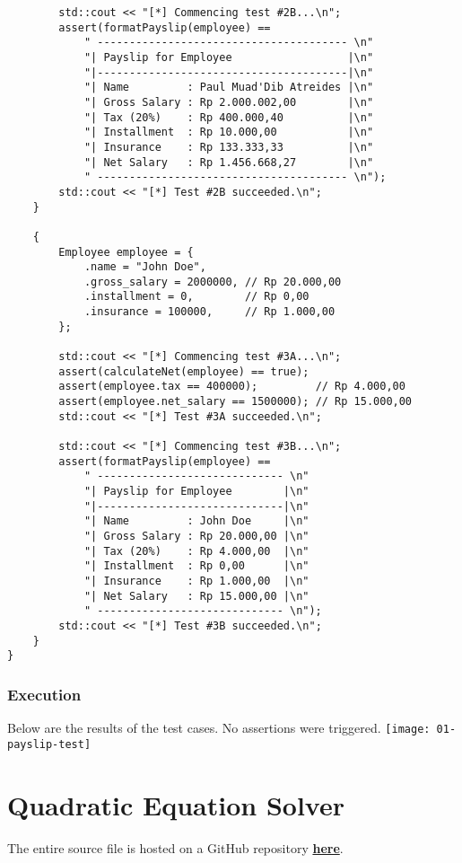 \documentclass[12pt]{article}
\begin{document}
\begin{verbatim}
        std::cout << "[*] Commencing test #2B...\n";
        assert(formatPayslip(employee) ==
            " --------------------------------------- \n"
            "| Payslip for Employee                  |\n"
            "|---------------------------------------|\n"
            "| Name         : Paul Muad'Dib Atreides |\n"
            "| Gross Salary : Rp 2.000.002,00        |\n"
            "| Tax (20%)    : Rp 400.000,40          |\n"
            "| Installment  : Rp 10.000,00           |\n"
            "| Insurance    : Rp 133.333,33          |\n"
            "| Net Salary   : Rp 1.456.668,27        |\n"
            " --------------------------------------- \n");
        std::cout << "[*] Test #2B succeeded.\n";
    }

    {
        Employee employee = {
            .name = "John Doe",
            .gross_salary = 2000000, // Rp 20.000,00
            .installment = 0,        // Rp 0,00
            .insurance = 100000,     // Rp 1.000,00
        };

        std::cout << "[*] Commencing test #3A...\n";
        assert(calculateNet(employee) == true);
        assert(employee.tax == 400000);         // Rp 4.000,00
        assert(employee.net_salary == 1500000); // Rp 15.000,00
        std::cout << "[*] Test #3A succeeded.\n";

        std::cout << "[*] Commencing test #3B...\n";
        assert(formatPayslip(employee) ==
            " ----------------------------- \n"
            "| Payslip for Employee        |\n"
            "|-----------------------------|\n"
            "| Name         : John Doe     |\n"
            "| Gross Salary : Rp 20.000,00 |\n"
            "| Tax (20%)    : Rp 4.000,00  |\n"
            "| Installment  : Rp 0,00      |\n"
            "| Insurance    : Rp 1.000,00  |\n"
            "| Net Salary   : Rp 15.000,00 |\n"
            " ----------------------------- \n");
        std::cout << "[*] Test #3B succeeded.\n";
    }
}
\end{verbatim}
\subsubsection{Execution}
Below are the results of the test cases. No assertions were triggered.
\texttt{[image: 01-payslip-test]}

\pagebreak
\section{Quadratic Equation Solver}
The entire source file is hosted on a GitHub repository \href{https://github.com/avaxar/uni-practica/blob/main/semester-1/2024-09-02/02-quadratic.cpp}{\textbf{here}}.
\end{document}
